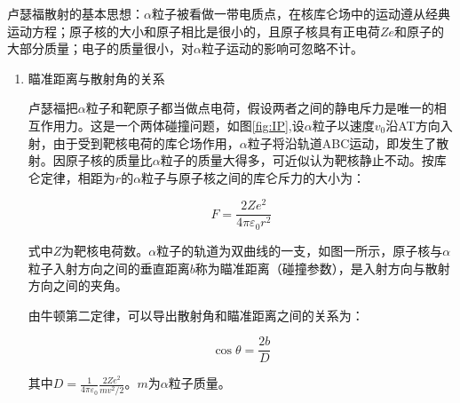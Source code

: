\documentclass{article}
\begin{document}
卢瑟福散射的基本思想：$\alpha$粒子被看做一带电质点，在核库仑场中的运动遵从经典运动方程；原子核的大小和原子相比是很小的，且原子核具有正电荷$Ze$和原子的大部分质量；电子的质量很小，对$\alpha$粒子运动的影响可忽略不计。
\begin{enumerate}
  \item 瞄准距离与散射角的关系

  卢瑟福把$\alpha$粒子和靶原子都当做点电荷，假设两者之间的静电斥力是唯一的相互作用力。这是一个两体碰撞问题，如图\ref{fig:IP},设$\alpha$粒子以速度$v_0$沿AT方向入射，由于受到靶核电荷的库仑场作用，$\alpha$粒子将沿轨道ABC运动，即发生了散射。因原子核的质量比$\alpha$粒子的质量大得多，可近似认为靶核静止不动。按库仑定律，相距为$r$的$\alpha$粒子与原子核之间的库仑斥力的大小为：
  
  \begin{equation}
    F = \frac{2Ze^2}{4\pi\varepsilon_0r^2}
  \end{equation}
  
  式中$Z$为靶核电荷数。$\alpha$粒子的轨道为双曲线的一支，如图一所示，原子核与$\alpha$粒子入射方向之间的垂直距离$b$称为瞄准距离（碰撞参数），是入射方向与散射方向之间的夹角。
  
  由牛顿第二定律，可以导出散射角和瞄准距离之间的关系为：
  
  \begin{equation}
    \cos\theta = \frac{2b}{D}
  \end{equation}
  
  其中$D = \frac{1}{4\pi\varepsilon_0}\frac{2Ze^2}{mv^2/2}$。$m$为$\alpha$粒子质量。
  \begin{figure}[htbp]
    \centering




\begin{tikzpicture}[x=0.75pt,y=0.75pt,yscale=-1,xscale=1]


\end{tikzpicture}
\end{figure}
\end{enumerate}
\end{document}
